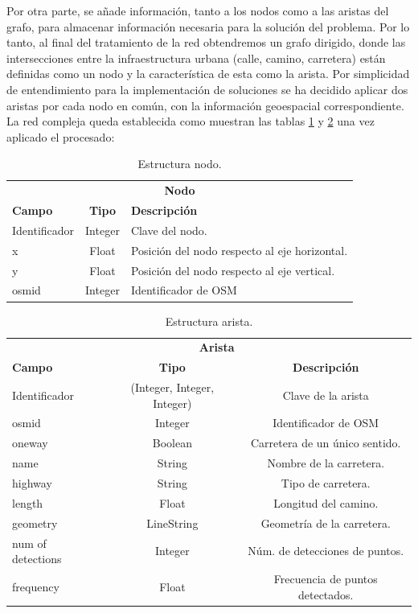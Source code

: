 Por otra parte, se añade información, tanto a los nodos como a las aristas del grafo, 
para almacenar información necesaria para la solución del problema. Por lo tanto, al 
final del tratamiento de la red obtendremos un grafo dirigido, donde las intersecciones 
entre la infraestructura urbana (calle, camino, carretera) están definidas como un nodo 
y la característica de esta como la arista. Por simplicidad de entendimiento para la 
implementación de soluciones se ha decidido aplicar dos aristas por cada nodo en 
común, con la información geoespacial correspondiente. La red compleja queda 
establecida como muestran las tablas \ref{TablaNodo} y \ref{TablaArista} una vez 
aplicado el procesado:
\begin{table}[h]
\centering
\begin{tabular}{l | c | l} 
\toprule
\multicolumn{3}{c}{\textbf{Nodo}} \\ 
\cmidrule(r){1-3}
{\textbf{Campo}} &  {\textbf{Tipo}} & {\textbf{Descripción}} \\
\cmidrule(r){1-3}
{Identificador}  & Integer  & Clave del nodo.\\
{x}  & Float & Posición del nodo respecto al eje horizontal. \\
{y}  & Float & Posición del nodo respecto al eje vertical.\\
{osmid} & Integer & Identificador de \ac{OSM} \\
\bottomrule
\end{tabular}
\caption{Estructura nodo.}
\label{TablaNodo}
\end{table}
\begin{table}[h]
\centering
\begin{tabular}{l | c | c } 
\toprule
\multicolumn{2}{r}{\textbf{Arista}} \\ 
\cmidrule(r){1-3}
{\textbf{Campo}} &  {\textbf{Tipo}} & {\textbf{Descripción}} \\
\cmidrule(r){1-3}
{Identificador}  & (Integer, Integer, Integer)  & {Clave de la arista}\\
{osmid}  & Integer  & Identificador de \ac{OSM} \\
{oneway} &  Boolean & Carretera de un único sentido. \\
{name} & String & Nombre de la carretera. \\
{highway} & String & Tipo de carretera. \\
{length} & Float & Longitud del camino. \\
{geometry} & LineString & Geometría de la carretera. \\
{num of detections} & Integer & Núm. de detecciones de puntos. \\
{frequency} & Float & Frecuencia de puntos detectados. \\
\bottomrule
\end{tabular}
\caption{Estructura arista.}
\label{TablaArista}
\end{table}
\newpage

